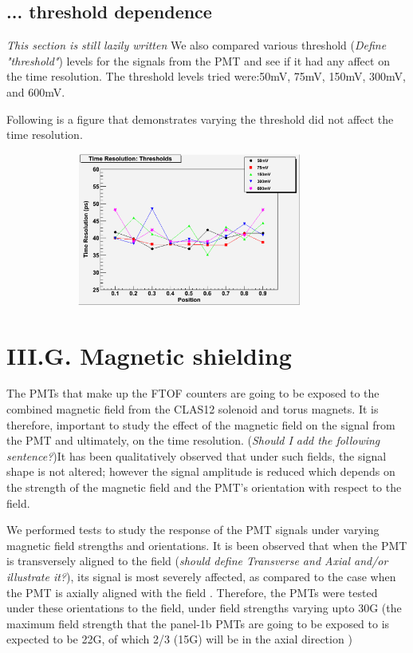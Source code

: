 \documentclass[12pt]{article}
\begin{document}
\subsection{... threshold dependence}
\textit{This section is still lazily written}
We also compared various threshold (\textit{Define "threshold"}) levels for the signals from the PMT and see if it had any affect on the time resolution. The threshold levels tried were:50mV, 75mV, 150mV, 300mV, and 600mV.

Following is a figure that demonstrates varying the threshold did not affect the time resolution.
\begin{figure}[th]
	\includegraphics[width=10cm, height=5cm]{ThresholdsTimeRes.eps}
\end{figure}

\section{III.G. Magnetic shielding}
The PMTs that make up the FTOF counters are going to be exposed to the combined magnetic field from the CLAS12 solenoid and torus magnets. It is therefore, important to study the effect of the magnetic field on the signal from the PMT and ultimately, on the time resolution. (\textit{Should I add the following sentence?})It has been qualitatively observed that under such fields, the signal shape is not altered; however the signal amplitude is reduced which depends on the strength of the magnetic field and the PMT's orientation with respect to the field. 

We performed tests to study the response of the PMT signals under varying magnetic field strengths and orientations. It is been observed that when the PMT is transversely aligned to the field (\textit{should define Transverse and Axial and/or illustrate it?}), its signal is most severely affected, as compared to the case when the PMT is axially aligned with the field \cite{Steinman}. Therefore, the PMTs were tested under these orientations to the field, under field strengths varying upto 30G (the maximum field strength that the panel-1b PMTs are going to be exposed to is expected to be 22G, of which 2/3 (15G) will be in the axial direction \cite{CLAS12FTOFstudies})
\end{document}
